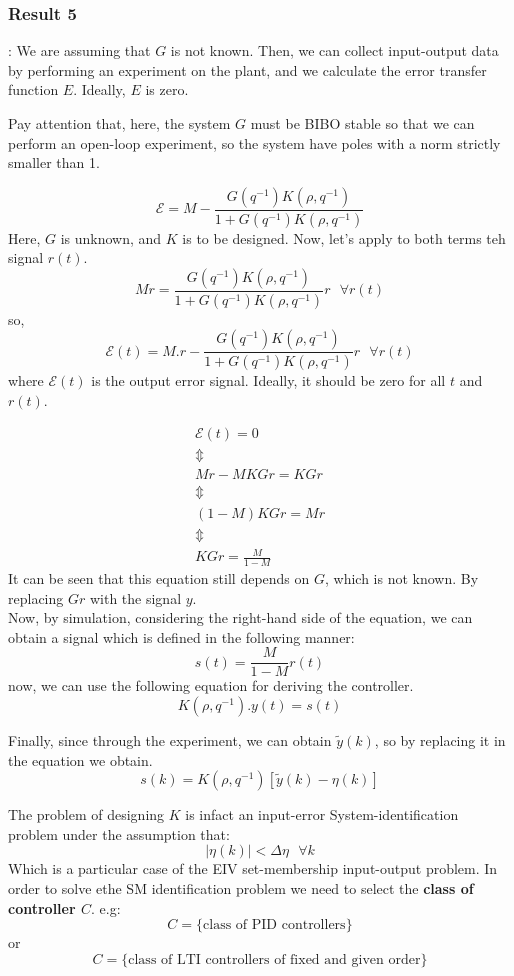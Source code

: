 \subsubsection{Result 5}:
We are assuming that $G$ is not known. Then, we can collect input-output data by performing an experiment on the plant, and we calculate the error transfer function $E$. Ideally, $E$ is zero.

\begin{factbox}
Pay attention that, here, the system $G$ must be BIBO stable so that we can perform an open-loop experiment, so the system have poles with a norm strictly smaller than 1. 
\end{factbox}

\[
\mathcal{E} = M - \frac{G(q^{-1}) K(\rho,q^{-1})}{1+G(q^{-1}) K(\rho,q^{-1})}
\]
Here, $G$ is unknown, and $K$ is to be designed. Now, let's apply to both terms teh signal $r(t)$.
\[
Mr =  \frac{G(q^{-1}) K(\rho,q^{-1})}{1+G(q^{-1}) K(\rho,q^{-1})}r \:\:\: \forall r(t)
\]
so,
\[
\mathcal{E}(t) = M.r - \frac{G(q^{-1}) K(\rho,q^{-1})}{1+G(q^{-1}) K(\rho,q^{-1})}r \:\:\: \forall r(t)
\]
where $\mathcal{E}(t)$ is the output error signal. Ideally, it should be zero for all $t$ and $r(t)$.

\[
\begin{array}{c}
\mathcal{E}(t) = 0 \\
\Updownarrow \\
Mr - MKGr = KGr \\
\Updownarrow \\
(1-M)KGr = Mr\\
\Updownarrow \\
KGr = \frac{M}{1-M}
\end{array}
\]
It can be seen that this equation still depends on $G$, which is not known. By replacing $Gr$ with the signal $y$.\\

Now, by simulation, considering the right-hand side of the equation, we can obtain a signal which is defined in the following manner:
\[
s(t) = \frac{M}{1-M} r(t)
\]
now, we can use the following equation for deriving the controller.
\[
K(\rho,q^{-1}) .y(t) = s(t)
\]

Finally, since through the experiment, we can obtain $\tilde{y}(k)$, so by replacing it in the equation we obtain.
\[
s(k) = K(\rho,q^{-1})[\tilde{y}(k) - \eta(k)]
\]

The problem of designing $K$ is infact an input-error System-identification problem under the assumption that:
\[
|\eta(k)|<\Delta\eta \:\:\: \forall k
\]
Which is a particular case of the EIV set-membership input-output problem. In order to solve ethe SM identification problem we need to select the \textbf{class of controller $C$}. e.g:
\[
C = \{\text{class of PID controllers}\}
\]
or
\[
C = \{\text{class of LTI controllers of fixed and given order}\}
\]

